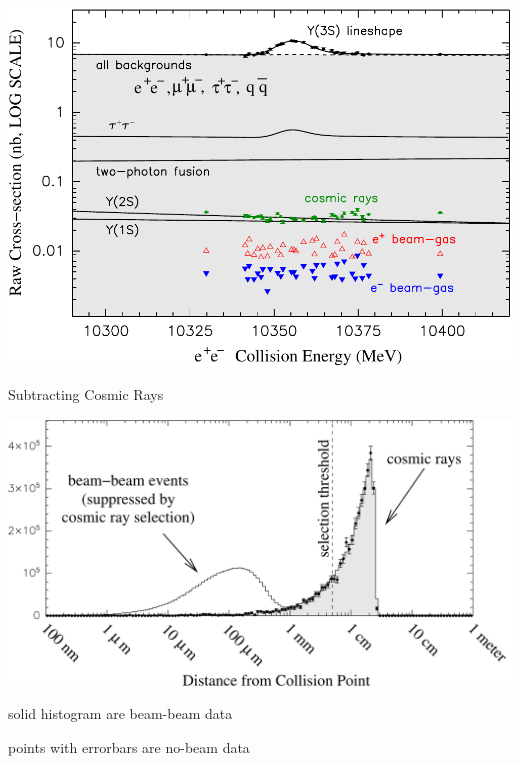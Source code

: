 \documentclass[landscape]{article}
\begin{document}
\begin{slide:backgrounds}
\begin{center}
\includegraphics[width=0.9\linewidth]{plots/awesome}
\end{center}
\vspace{-1 cm}
\end{slide:backgrounds}

\begin{slide:backgrounds}

Subtracting Cosmic Rays

\vfill
\begin{center}
\includegraphics[width=0.9\linewidth]{plots/cosmicscontamination}
\end{center}

\vfill
solid histogram are beam-beam data

points with errorbars are no-beam data

\end{slide:backgrounds}
\end{document}
